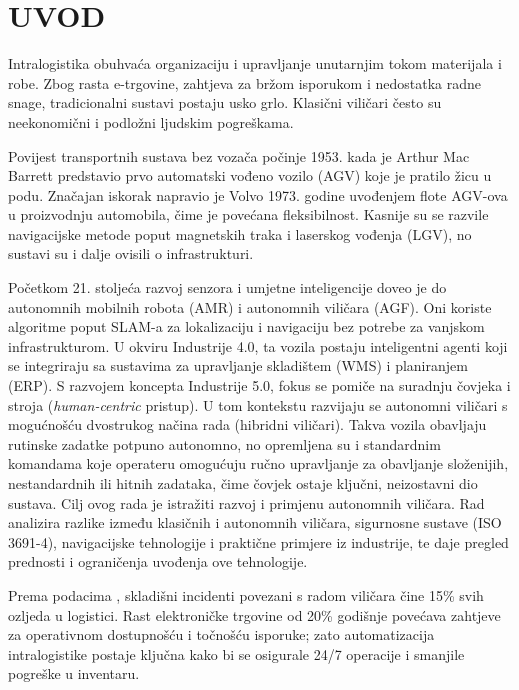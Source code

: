 \section{UVOD}
Intralogistika obuhvaća organizaciju i upravljanje unutarnjim tokom materijala i robe. Zbog rasta e-trgovine, zahtjeva za bržom isporukom i nedostatka radne snage, tradicionalni sustavi postaju usko grlo. Klasični viličari često su neekonomični i podložni ljudskim pogreškama.

Povijest transportnih sustava bez vozača počinje 1953. kada je Arthur Mac Barrett predstavio prvo \cite{barrett} automatski vođeno vozilo (AGV) koje je pratilo žicu u podu. Značajan iskorak napravio je Volvo 1973. godine uvođenjem flote AGV-ova u proizvodnju automobila, čime je povećana fleksibilnost. Kasnije su se razvile navigacijske metode poput magnetskih traka i laserskog vođenja (LGV), no sustavi su i dalje ovisili o infrastrukturi.

Početkom 21. stoljeća razvoj senzora i umjetne inteligencije doveo je do autonomnih mobilnih robota (AMR) i autonomnih viličara (AGF). Oni koriste algoritme poput SLAM-a za lokalizaciju i navigaciju bez potrebe za vanjskom infrastrukturom. U okviru Industrije 4.0, ta vozila postaju inteligentni agenti koji se integriraju sa sustavima za upravljanje skladištem (WMS) i planiranjem (ERP). S razvojem koncepta Industrije 5.0, fokus se pomiče na suradnju čovjeka i stroja (\textit{human-centric} pristup). U tom kontekstu razvijaju se autonomni viličari s mogućnošću dvostrukog načina rada (hibridni viličari). Takva vozila obavljaju rutinske zadatke potpuno autonomno, no opremljena su i standardnim komandama koje operateru omogućuju ručno upravljanje za obavljanje složenijih, nestandardnih ili hitnih zadataka, čime čovjek ostaje ključni, neizostavni dio sustava.
Cilj ovog rada je istražiti razvoj i primjenu autonomnih viličara. Rad analizira razlike između klasičnih i autonomnih viličara, sigurnosne sustave (ISO 3691-4), navigacijske tehnologije i praktične primjere iz industrije, te daje pregled prednosti i ograničenja uvođenja ove tehnologije.

Prema podacima \cite{dzs,ecommerce_report}, skladišni incidenti povezani s radom viličara čine 15\% svih ozljeda u logistici. Rast elektroničke trgovine od 20\% godišnje povećava zahtjeve za operativnom dostupnošću i točnošću isporuke; zato automatizacija intralogistike postaje ključna kako bi se osigurale 24/7 operacije i smanjile pogreške u inventaru.
